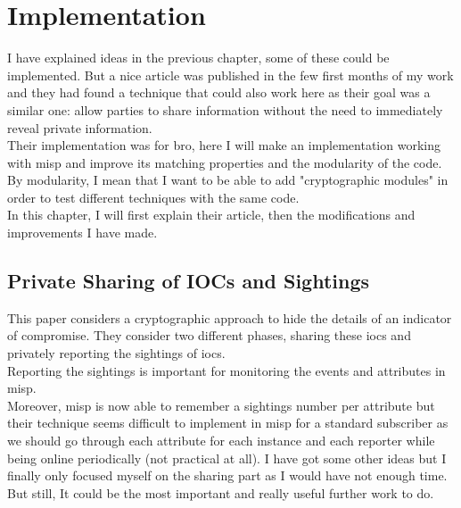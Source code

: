 \documentclass{eplmastersthesis}
\begin{document}
\chapter{Implementation}
\label{chap:Implementation}
I have explained ideas in the previous chapter, some of these could be implemented. But a nice article \cite{van2016private} was published in the few first months of my work and they had found a technique that could also work here as their goal was a similar one: allow parties to share information without the need to immediately reveal private information.\\
Their implementation was for bro, here I will make an implementation working with \gls{misp} and improve its matching properties and the modularity of the code. \\
By modularity, I mean that I want to be able to add "cryptographic modules" in order to test different techniques with the same code.\\
In this chapter, I will first explain their article, then the modifications and improvements I have made.\\

\section{Private Sharing of IOCs and Sightings \cite{van2016private}}
\label{sec:articlePrivate}
This paper considers a cryptographic approach to hide the details of an indicator of compromise. They consider two different phases, sharing these \gls{ioc}s and privately reporting the sightings of \gls{ioc}s.\\

Reporting the sightings is important for monitoring the events and attributes in \gls{misp}.\\ 
Moreover, \gls{misp} is now able to remember a sightings number per attribute but their technique seems difficult to implement in \gls{misp} for a standard subscriber as we should go through each attribute for each instance and each reporter while being online periodically (not practical at all). I have got some other ideas but I finally only focused myself on the sharing part as I would have not enough time.\\ 
But still, It could be the most important and really useful further work to do.\\
\end{document}
